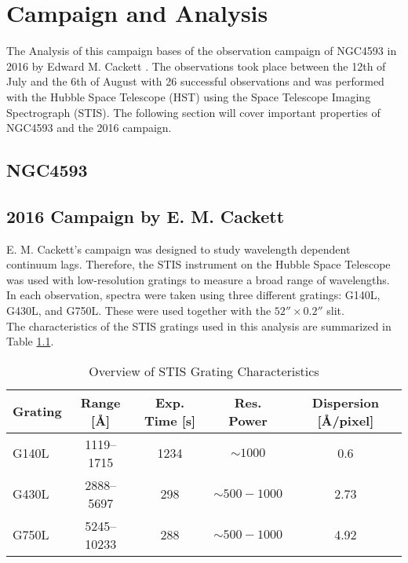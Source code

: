 \chapter{Campaign and Analysis}
\label{campaign_and_analysis}
The Analysis of this campaign bases of the observation campaign of NGC4593 in 2016 by Edward M. Cackett \cite{cackett2018accretion}. The observations took place between the 12th of July and the 6th of August with 26 successful observations and was performed with the Hubble Space Telescope (HST) using the Space Telescope Imaging Spectrograph (STIS). The following section will cover important properties of NGC4593 and the 2016 campaign.

\section{NGC4593}
\label{NGC4593}



\section{2016 Campaign by E. M. Cackett}
\label{Campaign_Cackett}

E. M. Cackett's campaign was designed to study wavelength dependent continuum lags. Therefore, the STIS instrument on the Hubble Space Telescope was used with low-resolution gratings to measure a broad range of wavelengths. In each observation, spectra were taken using three different gratings: G140L, G430L, and G750L. These were used together with the $52'' \times 0.2''$ slit.\\
The characteristics of the STIS gratings used in this analysis are summarized in Table \ref{tab:stis_gratings}.

\begin{table}[h!]
	\centering
	\small
	\caption{Overview of STIS Grating Characteristics \cite{stisgratings}}
	\label{tab:stis_gratings}
	\begin{tabular}{lcccc}
		\hline
		\textbf{Grating} & \textbf{Range [\AA]} & \textbf{Exp. Time [s]} & \textbf{Res. Power} & \textbf{Dispersion [\AA/pixel]} \\
		\hline
		G140L  & 1119--1715  & 1234 & $\sim 1000$         & 0.6 \\
		G430L  & 2888--5697  & 298  & $\sim 500 - 1000$    & 2.73 \\
		G750L  & 5245--10233 & 288  & $\sim 500 - 1000$    & 4.92 \\
		\hline
	\end{tabular}
\end{table}

